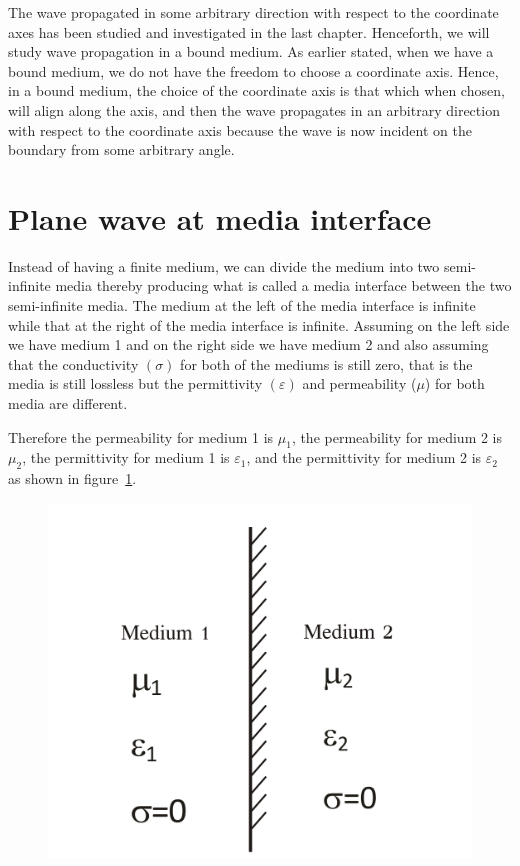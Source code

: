 The wave propagated in some arbitrary direction with respect to the coordinate axes has been studied and investigated in the last chapter. Henceforth, we will study wave propagation in a bound medium. As earlier stated, when we have a bound medium, we do not have the freedom to choose a coordinate axis. Hence, in a bound medium, the choice of the coordinate axis is that which when chosen, will align along the axis, and then the wave propagates in an arbitrary direction with respect to the coordinate axis because the wave is now incident on the boundary from some arbitrary angle.

\section{Plane wave at media interface}

Instead of having a finite medium, we can divide the medium into two semi-infinite media thereby producing what is called a media interface between the two semi-infinite media. The medium at the left of the media interface is infinite while that at the right of the media interface is infinite. Assuming on the left side we have medium 1 and on the right side we have medium 2 and also assuming that the conductivity $(\sigma)$ for both of the mediums is still zero, that is the media is still lossless but the permittivity $(\varepsilon)$ and permeability ($\mu$) for both media are different.

Therefore the permeability for medium 1 is $\mu_1$, the permeability for medium 2 is $\mu_2$, the permittivity for medium 1 is $\varepsilon_1$, and the permittivity for medium 2 is $\varepsilon_2$ as shown in figure~\ref{fig:group30a}.

\begin{figure}[h]
\centering
\includegraphics[width=.7\linewidth]{graphics/group30a}
\caption{}
\label{fig:group30a}
\end{figure}

